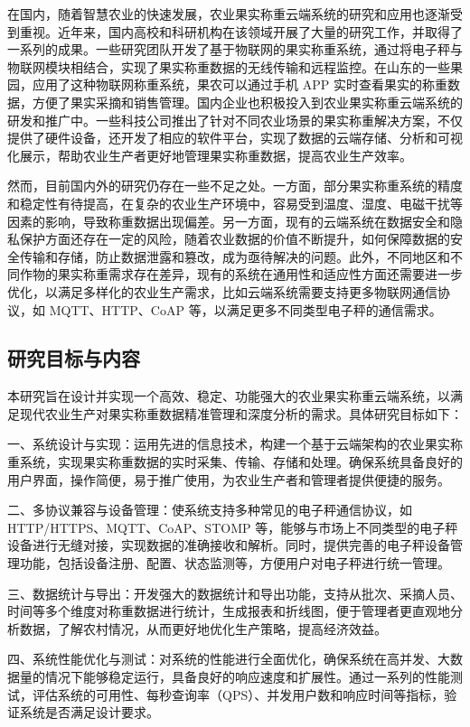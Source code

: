 \documentclass{xduugmr}
\begin{document}
在国内，随着智慧农业的快速发展，农业果实称重云端系统的研究和应用也逐渐受到重视。近年来，国内高校和科研机构在该领域开展了大量的研究工作，并取得了一系列的成果。一些研究团队开发了基于物联网的果实称重系统，通过将电子秤与物联网模块相结合，实现了果实称重数据的无线传输和远程监控\cite{Zhu2013}。在山东的一些果园，应用了这种物联网称重系统，果农可以通过手机 APP 实时查看果实的称重数据，方便了果实采摘和销售管理\cite{Gao2023}。国内企业也积极投入到农业果实称重云端系统的研发和推广中。一些科技公司推出了针对不同农业场景的果实称重解决方案\cite{Ningbo2019}，不仅提供了硬件设备，还开发了相应的软件平台，实现了数据的云端存储、分析和可视化展示，帮助农业生产者更好地管理果实称重数据，提高农业生产效率。

然而，目前国内外的研究仍存在一些不足之处。一方面，部分果实称重系统的精度和稳定性有待提高，在复杂的农业生产环境中，容易受到温度、湿度、电磁干扰等因素的影响，导致称重数据出现偏差\cite{汤建华2018}。另一方面，现有的云端系统在数据安全和隐私保护方面还存在一定的风险，随着农业数据的价值不断提升，如何保障数据的安全传输和存储，防止数据泄露和篡改，成为亟待解决的问题。此外，不同地区和不同作物的果实称重需求存在差异，现有的系统在通用性和适应性方面还需要进一步优化，以满足多样化的农业生产需求，比如云端系统需要支持更多物联网通信协议，如 MQTT、HTTP、CoAP 等，以满足更多不同类型电子秤的通信需求。

\subsection{研究目标与内容}

本研究旨在设计并实现一个高效、稳定、功能强大的农业果实称重云端系统，以满足现代农业生产对果实称重数据精准管理和深度分析的需求。具体研究目标如下：

一、系统设计与实现：运用先进的信息技术，构建一个基于云端架构的农业果实称重系统，实现果实称重数据的实时采集、传输、存储和处理。确保系统具备良好的用户界面，操作简便，易于推广使用，为农业生产者和管理者提供便捷的服务。

二、多协议兼容与设备管理：使系统支持多种常见的电子秤通信协议，如 HTTP/HTTPS、MQTT、CoAP、STOMP 等，能够与市场上不同类型的电子秤设备进行无缝对接，实现数据的准确接收和解析。同时，提供完善的电子秤设备管理功能，包括设备注册、配置、状态监测等，方便用户对电子秤进行统一管理。

三、数据统计与导出：开发强大的数据统计和导出功能，支持从批次、采摘人员、时间等多个维度对称重数据进行统计，生成报表和折线图，便于管理者更直观地分析数据，了解农村情况，从而更好地优化生产策略，提高经济效益。

四、系统性能优化与测试：对系统的性能进行全面优化，确保系统在高并发、大数据量的情况下能够稳定运行，具备良好的响应速度和扩展性。通过一系列的性能测试，评估系统的可用性、每秒查询率（QPS）、并发用户数和响应时间等指标，验证系统是否满足设计要求。
\end{document}
